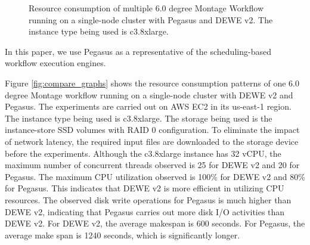 \begin{figure}[t!]
\centering
\vspace{-10pt}
 \hspace{5pt}
  \hspace{5pt}
  \caption{Resource consumption of multiple 6.0 degree Montage Workflow running on a single-node cluster with Pegasus and DEWE v2. The instance type being used is c3.8xlarge.} 
  \vspace{-15pt}
  \label{fig:multi_run} 
\end{figure}

In this paper, we use Pegasus as a representative of the scheduling-based workflow execution engines. 

Figure \ref{fig:compare_graphs} shows the resource consumption patterns of one 6.0 degree Montage workflow running on a single-node cluster with DEWE v2 and Pegasus. The experiments are carried out on AWS EC2 in its us-east-1 region. The instance type being used is c3.8xlarge. The storage being used is the instance-store SSD volumes with RAID 0 configuration. To eliminate the impact of network latency, the required input files are downloaded to the storage device before the experiments. Although the c3.8xlarge instance has 32 vCPU, the maximum number of concurrent threads observed is 25 for DEWE v2 and 20 for Pegasus. The maximum CPU utilization observed is 100\% for DEWE v2 and 80\% for Pegasus. This indicates that DEWE v2 is more efficient in utilizing CPU resources. The observed disk write operations for Pegasus is much higher than DEWE v2, indicating that Pegasus carries out more disk I/O activities than DEWE v2. For DEWE v2, the average makespan is 600 seconds. For Pegasus, the average make span is 1240 seconds, which is significantly longer. 


